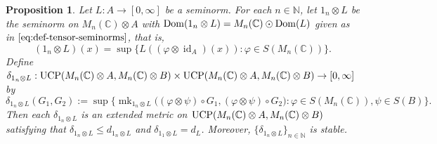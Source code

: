\documentclass[11pt, a4paper, oneside, final, reqno]{amsart}
\newcommand{\bbN}{\mathbb{N}}
\newcommand{\bbC}{\mathbb{C}}
\newcommand{\UCP}{\operatorname{UCP}}
\newcommand{\id}{\operatorname{id}}
\newcommand{\mk}{\operatorname{mk}}
\theoremstyle{definition}
\theoremstyle{plain}
\newtheorem{proposition}[definition]{Proposition}
\theoremstyle{remark}
\numberwithin{equation}{section}
\begin{document}
\begin{proposition}\label{Ln1}
    Let $L:A\to [0, \infty]$  be a seminorm. For each $n\in \bbN$, let $1_n\otimes L$ be the seminorm on $M_n(\bbC)\otimes A$  with ${\rm Dom}(1_n\otimes L) = M_n(\bbC)\odot {\rm Dom}(L)$ given as in $\eqref{eq:def-tensor-seminorms}$, that is,
    \begin{equation*}
        (1_n\otimes L)(x) = \sup\{ L((\varphi \otimes \id_A)(x)) \colon \varphi \in S(M_n(\bbC)) \}.
    \end{equation*}
    Define $\delta_{1_n\otimes L}: {\rm UCP}(M_n(\bbC)\otimes A, M_n(\bbC)\otimes B) \times \UCP(M_n(\bbC)\otimes A, M_n(\bbC)\otimes B) \to [0, \infty]$ by
    \begin{equation*}
        \delta_{1_n\otimes L}(G_1, G_2) := \sup\big\{\mk_{1_n\otimes L}\big((\varphi \otimes \psi) \circ G_1,(\varphi\otimes \psi)\circ G_2\big) : \varphi \in S(M_n(\bbC)), \psi \in S(B)\big\}.
    \end{equation*}
    Then each $\delta_{1_n\otimes L}$ is an extended metric on ${\rm UCP}(M_n(\bbC)\otimes A, M_n(\bbC)\otimes B)$ satisfying that $\delta_{1_n\otimes L} \leq d_{1_n\otimes L}$ and $\delta_{1_1\otimes L} = d_L$. Moreover, $\{\delta_{1_n\otimes L}\}_{n\in \bbN}$ is stable.
\end{proposition}
\end{document}
